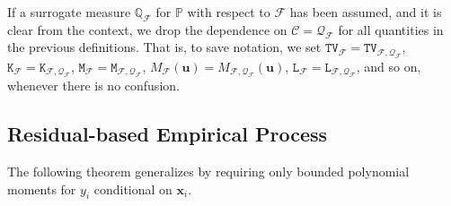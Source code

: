 \documentclass[10pt]{article}
\renewcommand{\P}{\mathbb{P}}
\newcommand{\bu}{\mathbf{u}}
\newcommand{\bx}{\mathbf{x}}
\newcommand{\C}{\mathcal{C}}
\newcommand{\F}{\mathcal{F}}
\newcommand{\bbQ}{\mathbb{Q}}
\newcommand{\ttK}{\mathtt{K}}
\newcommand{\ttL}{\mathtt{L}}
\newcommand{\ttM}{\mathtt{M}}
\newcommand{\ttTV}{\mathtt{TV}}
\begin{document}
If a surrogate measure $\bbQ_\F$ for $\P$ with respect to $\F$ has been assumed, and it is clear from the context, we drop the dependence on $\C = \mathcal{Q}_{\F}$ for all quantities in the previous definitions. That is, to save notation, we set $\ttTV_{\F}=\ttTV_{\F,\mathcal{Q}_{\F}}$, $\ttK_{\F}=\ttK_{\F,\mathcal{Q}_{\F}}$, $\ttM_{\F}=\ttM_{\F,\mathcal{Q}_{\F}}$, $M_{\F}(\bu)=M_{\F,\mathcal{Q}_{\F}}(\bu)$, $\ttL_{\F}=\ttL_{\F,\mathcal{Q}_{\F}}$, and so on, whenever there is no confusion.

\subsection{Residual-based Empirical Process}

The following theorem generalizes \citet[Theorem 2]{Cattaneo-Yu_2025_AOS} by requiring only bounded polynomial moments for $y_i$ conditional on $\bx_i$.
\end{document}
